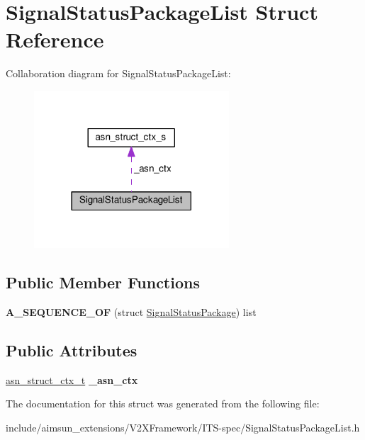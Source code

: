 \hypertarget{structSignalStatusPackageList}{}\section{Signal\+Status\+Package\+List Struct Reference}
\label{structSignalStatusPackageList}


Collaboration diagram for Signal\+Status\+Package\+List\+:\nopagebreak
\begin{figure}[H]
\begin{center}
\leavevmode
\includegraphics[width=206pt]{structSignalStatusPackageList__coll__graph}
\end{center}
\end{figure}
\subsection*{Public Member Functions}
\begin{DoxyCompactItemize}
\item 
{\bfseries A\+\_\+\+S\+E\+Q\+U\+E\+N\+C\+E\+\_\+\+OF} (struct \hyperlink{structSignalStatusPackage}{Signal\+Status\+Package}) list\hypertarget{structSignalStatusPackageList_a51d4381846130d8b2aa05ca84875ddcf}{}\label{structSignalStatusPackageList_a51d4381846130d8b2aa05ca84875ddcf}

\end{DoxyCompactItemize}
\subsection*{Public Attributes}
\begin{DoxyCompactItemize}
\item 
\hyperlink{structasn__struct__ctx__s}{asn\+\_\+struct\+\_\+ctx\+\_\+t} {\bfseries \+\_\+asn\+\_\+ctx}\hypertarget{structSignalStatusPackageList_a853960113de13de3de4971c78bf4bae7}{}\label{structSignalStatusPackageList_a853960113de13de3de4971c78bf4bae7}

\end{DoxyCompactItemize}


The documentation for this struct was generated from the following file\+:\begin{DoxyCompactItemize}
\item 
include/aimsun\+\_\+extensions/\+V2\+X\+Framework/\+I\+T\+S-\/spec/Signal\+Status\+Package\+List.\+h\end{DoxyCompactItemize}
